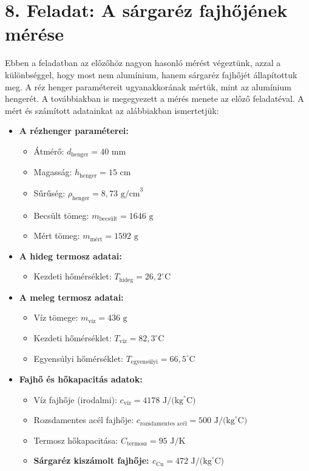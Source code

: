 \documentclass{article}
\begin{document}
\section*{8. Feladat: A sárgaréz fajhőjének mérése}

Ebben a feladatban az előzőhöz nagyon hasonló mérést végeztünk, azzal a különbséggel, hogy most nem alumínium, hanem sárgaréz fajhőjét állapítottuk meg. A réz henger paramétereit ugyanakkorának mértük, mint az alumínium hengerét. A továbbiakban is megegyezett a mérés menete az előző feladatéval. A mért és számított adatainkat az alábbiakban ismertetjük:

\begin{itemize}
    \item \textbf{A rézhenger paraméterei:}
    \begin{itemize}
        \item Átmérő: $d_{\text{henger}} = 40 \text{ mm}$
        \item Magasság: $h_{\text{henger}} = 15 \text{ cm}$
        \item Sűrűség: $\rho_{\text{henger}} = 8,73 \text{ g/cm}^3$
        \item Becsült tömeg: $m_{\text{becsült}} = 1646 \text{ g}$
        \item Mért tömeg: $m_{\text{mért}} = 1592 \text{ g}$
    \end{itemize}
    \item \textbf{A hideg termosz adatai:}
    \begin{itemize}
        \item Kezdeti hőmérséklet: $T_{\text{hideg}} = 26,2^{\circ}\text{C}$
    \end{itemize}
    \item \textbf{A meleg termosz adatai:}
    \begin{itemize}
        \item Víz tömege: $m_{\text{víz}} = 436 \text{ g}$
        \item Kezdeti hőmérséklet: $T_{\text{víz}} = 82,3^{\circ}\text{C}$
        \item Egyensúlyi hőmérséklet: $T_{\text{egyensúlyi}} = 66,5^{\circ}\text{C}$
    \end{itemize}
    \item \textbf{Fajhő és hőkapacitás adatok:}
    \begin{itemize}
        \item Víz fajhője (irodalmi): $c_{\text{víz}} = 4178 \text{ J/(kg}^{\circ}\text{C)}$
        \item Rozsdamentes acél fajhője: $c_{\text{rozsdamentes acél}} = 500 \text{ J/(kg}^{\circ}\text{C)}$
        \item Termosz hőkapacitása: $C_{\text{termosz}} = 95 \text{ J/K}$
        \item \textbf{Sárgaréz kiszámolt fajhője: $c_{\text{Cu}} = 472 \text{ J/(kg}^{\circ}\text{C)}$}
    \end{itemize}
\end{itemize}
\end{document}
